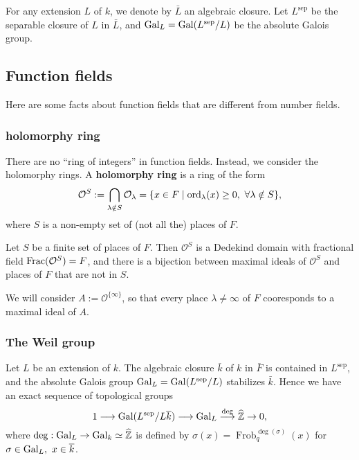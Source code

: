 \documentclass{article}
\newcommand{\F}{\mathbb{F}}
\newcommand{\sep}{\mathrm{sep}}
\renewcommand{\O}{\mathcal{O}}
\newcommand{\m}{\mathfrak{m}}
\DeclareMathOperator{\frob}{Frob}
\begin{document}
For any extension $L$ of $k$, we denote by $\bar{L}$ an algebraic closure. Let $L^\sep$ be the separable closure of $L$ in $\bar L$, and $\gal_L = \gal(L^\sep/L)$ be the absolute Galois group.

\subsection{Function fields}
Here are some facts about function fields that are different from number fields.
\subsubsection{holomorphy ring}
There are no ``ring of integers'' in function fields.
Instead, we consider the holomorphy rings.
A \textbf{holomorphy ring} is a ring of the form
\[\O^S := \bigcap_{\lambda\notin S} \O_\lambda = \{x\in F\mid \ord_\lambda(x)\ge 0,\ \forall\lambda\notin S\},\]
where $S$ is a non-empty set of (not all the) places of $F$.
\begin{proposition}
Let $S$ be a finite set of places of $F$. Then $\O^S$ is a Dedekind domain with fractional field $\Frac(\O^S) = F$,
and there is a bijection between maximal ideals of $\O^S$ and places of $F$ that are not in $S$.
\end{proposition}
We will consider $A := \O^{\{\infty\}}$, so that every place $\lambda\ne\infty$ of $F$ cooresponds to a maximal ideal of $A$.

\subsubsection{The Weil group}
Let $L$ be an extension of $k$.
The algebraic closure $\bar k$ of $k$ in $\bar F$ is contained in $L^\sep$,
and the absolute Galois group $\gal_L = \gal(L^\sep/L)$ stabilizes $\bar k$.
Hence we have
an exact sequence of topological groups
\[1\longrightarrow\gal(L^\sep/L\bar{k})\longrightarrow \gal_L\stackrel{\deg}{\longrightarrow}\hat\Z\to 0,\]
where $\deg : \operatorname{Gal}_L\to \operatorname{Gal}_k\simeq\widehat{\mathbb{Z}}$ is defined by
$\sigma(x) = \frob_q^{\deg(\sigma)}(x)$ for $\sigma\in \gal_L,\ x\in\bar{k}$.
\end{document}
